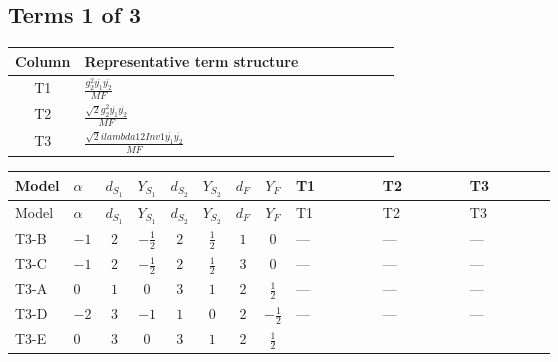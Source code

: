 \documentclass[8pt]{article}
\begin{document}
\begin{landscape}
\subsection*{Terms 1 of 3}
\begin{center}
\begin{tabular}{@{}c >{\raggedright\arraybackslash}p{0.82\linewidth}@{}}
\toprule
Column & Representative term structure \\
\midrule
T1 & \(\displaystyle \frac{g_{2}^{2} \overline{y_{1}} \overline{y_{2}}}{MF}\) \\
\midrule
T2 & \(\displaystyle \frac{\sqrt{2} g_{2}^{2} \overline{y_{1}} \overline{y_{2}}}{MF}\) \\
\midrule
T3 & \(\displaystyle \frac{\sqrt{2} i lambda12Inv1 \overline{y_{1}} \overline{y_{2}}}{MF}\) \\
\midrule
\bottomrule
\end{tabular}
\end{center}
\smallskip
\tiny
\begin{longtable}{@{}llcccccc >{\raggedright\arraybackslash}p{0.21\linewidth} >{\raggedright\arraybackslash}p{0.21\linewidth} >{\raggedright\arraybackslash}p{0.21\linewidth}@{}}
\toprule
Model & $\alpha$ & $d_{S_1}$ & $Y_{S_1}$ & $d_{S_2}$ & $Y_{S_2}$ & $d_F$ & $Y_F$ & T1 & T2 & T3 \\
\midrule
\endfirsthead
\toprule
Model & $\alpha$ & $d_{S_1}$ & $Y_{S_1}$ & $d_{S_2}$ & $Y_{S_2}$ & $d_F$ & $Y_F$ & T1 & T2 & T3 \\
\midrule
\endhead
T3-B & $-1$ & $2$ & $-\frac{1}{2}$ & $2$ & $\frac{1}{2}$ & $1$ & $0$ & --- & --- & --- \\
\midrule
T3-C & $-1$ & $2$ & $-\frac{1}{2}$ & $2$ & $\frac{1}{2}$ & $3$ & $0$ & --- & --- & --- \\
\midrule
T3-A & $0$ & $1$ & $0$ & $3$ & $1$ & $2$ & $\frac{1}{2}$ & --- & --- & --- \\
\midrule
T3-D & $-2$ & $3$ & $-1$ & $1$ & $0$ & $2$ & $-\frac{1}{2}$ & --- & --- & --- \\
\midrule
T3-E & $0$ & $3$ & $0$ & $3$ & $1$ & $2$ & $\frac{1}{2}$ & \scriptsize\adjustbox{max width=\linewidth}{$\begin{gathered} - \frac{g_{2}^{2} \overline{y_{1}} \overline{y_{2}}}{MF}\end{gathered}$} & \scriptsize\adjustbox{max width=\linewidth}{$\begin{gathered} - \frac{\sqrt{2} g_{2}^{2} \overline{y_{1}} \overline{y_{2}}}{4 MF}\end{gathered}$} & \scriptsize\adjustbox{max width=\linewidth}{$\begin{gathered} - \frac{\sqrt{2} i lambda12Inv1 \overline{y_{1}} \overline{y_{2}}}{4 MF}\end{gathered}$} \\
\midrule
\bottomrule
\end{longtable}
\clearpage

\end{landscape}
\end{document}
